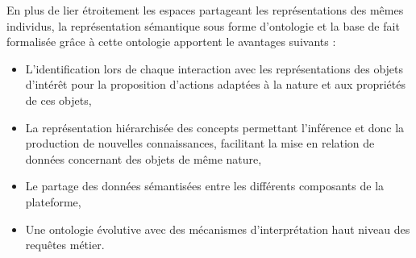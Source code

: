 
En plus de lier étroitement les espaces partageant les représentations des mêmes individus, la représentation sémantique sous forme d'ontologie et la base de fait formalisée grâce à cette ontologie apportent le avantages suivants :



\begin{itemize}
    \item L'identification lors de chaque interaction avec les représentations des objets d'intérêt pour la proposition d'actions adaptées à la nature et aux propriétés de ces objets, 
    \item La représentation hiérarchisée des concepts permettant l'inférence et donc la production de nouvelles connaissances, facilitant la mise en relation de données concernant des objets de même nature,  
    \item Le partage des données sémantisées entre les différents composants de la plateforme, 
    \item Une ontologie évolutive avec des mécanismes d'interprétation haut niveau des requêtes métier.
\end{itemize}


